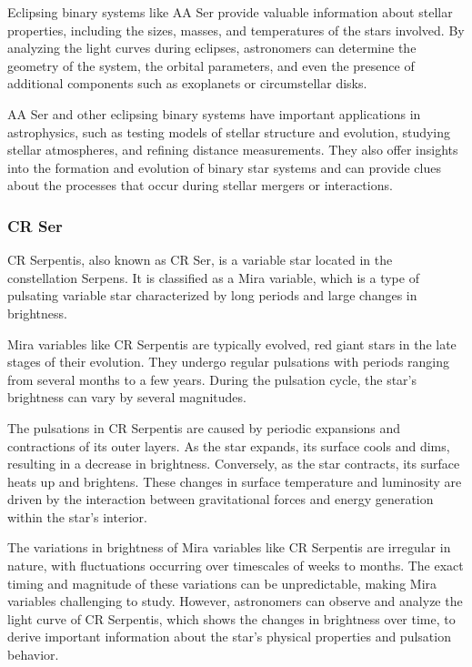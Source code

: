 Eclipsing binary systems like AA Ser provide valuable information about stellar properties, including the sizes, masses, and temperatures of the stars involved. By analyzing the light curves during eclipses, astronomers can determine the geometry of the system, the orbital parameters, and even the presence of additional components such as exoplanets or circumstellar disks.

AA Ser and other eclipsing binary systems have important applications in astrophysics, such as testing models of stellar structure and evolution, studying stellar atmospheres, and refining distance measurements. They also offer insights into the formation and evolution of binary star systems and can provide clues about the processes that occur during stellar mergers or interactions.


\subsubsection*{ CR Ser }
CR Serpentis, also known as CR Ser, is a variable star located in the constellation Serpens. It is classified as a Mira variable, which is a type of pulsating variable star characterized by long periods and large changes in brightness.

Mira variables like CR Serpentis are typically evolved, red giant stars in the late stages of their evolution. They undergo regular pulsations with periods ranging from several months to a few years. During the pulsation cycle, the star's brightness can vary by several magnitudes.

The pulsations in CR Serpentis are caused by periodic expansions and contractions of its outer layers. As the star expands, its surface cools and dims, resulting in a decrease in brightness. Conversely, as the star contracts, its surface heats up and brightens. These changes in surface temperature and luminosity are driven by the interaction between gravitational forces and energy generation within the star's interior.

The variations in brightness of Mira variables like CR Serpentis are irregular in nature, with fluctuations occurring over timescales of weeks to months. The exact timing and magnitude of these variations can be unpredictable, making Mira variables challenging to study. However, astronomers can observe and analyze the light curve of CR Serpentis, which shows the changes in brightness over time, to derive important information about the star's physical properties and pulsation behavior.

